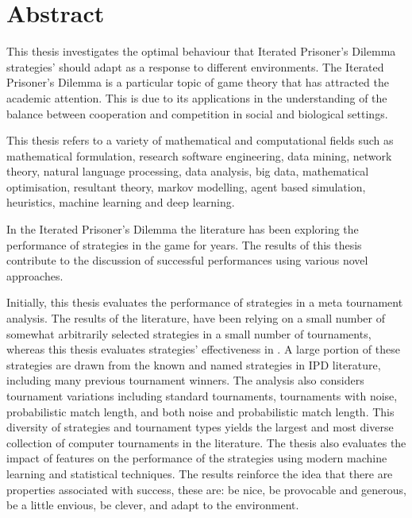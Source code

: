 \chapter{Abstract}

This thesis investigates the optimal behaviour that Iterated Prisoner's Dilemma
strategies' should adapt as a response to different environments. The Iterated
Prisoner's Dilemma is a particular topic of game theory that has attracted the
academic attention. This is due to its applications in the understanding of the
balance between cooperation and competition in social and biological settings.

This thesis refers to a variety of mathematical and computational fields such as
mathematical formulation, research software engineering, data mining, network
theory, natural language processing, data analysis, big data, mathematical
optimisation, resultant theory, markov modelling, agent based simulation,
heuristics, machine learning and deep learning. %

In the Iterated Prisoner's Dilemma the literature has been exploring the
performance of strategies in the game for years. The results of this thesis
contribute to the discussion of successful performances using various novel
approaches.

Initially, this thesis evaluates the performance of strategies in a meta
tournament analysis. The results of the literature, have been relying on a small
number of somewhat arbitrarily selected strategies in a small number of
tournaments, whereas this thesis evaluates \numberofstrategies strategies'
effectiveness in \numberofalltournaments. A large portion of these strategies
are drawn from the known and named strategies in IPD literature, including many
previous tournament winners. The analysis also considers tournament variations
including standard tournaments, tournaments with noise, probabilistic match
length, and both noise and probabilistic match length. This diversity of
strategies and tournament types yields the largest and most diverse collection
of computer tournaments in the literature. The thesis also evaluates the impact
of features on the performance of the  \numberofstrategies strategies using
modern machine learning and statistical techniques. The results reinforce the
idea that there are properties associated with success, these are: be nice, be
provocable and generous, be a little envious, be clever, and adapt to the
environment.

